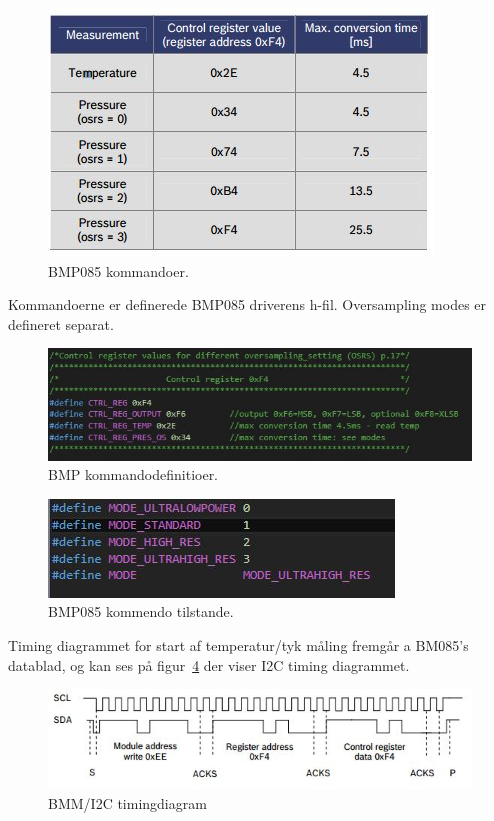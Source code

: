 \begin{figure}[h]
	\centering
	\includegraphics[width=0.6\linewidth]{figs/bmp085_commands}
	\caption{BMP085 kommandoer.}
	\label{fig:bmp085commands}
\end{figure}

Kommandoerne er definerede BMP085 driverens h-fil. Oversampling modes er defineret separat.

\begin{figure}[h]
	\centering
	\includegraphics[width=0.7\linewidth]{figs/bmp085_command_defines}
	\caption{BMP kommandodefinitioer.}
	\label{fig:bmp085commanddefines}
\end{figure}

\begin{figure}[h]
	\centering
	\includegraphics[width=0.7\linewidth]{figs/bmp085_command_modes}
	\caption{BMP085 kommendo tilstande.}
	\label{fig:bmp085commandmodes}
\end{figure}

Timing diagrammet for start af temperatur/tyk måling fremgår a BM085’s datablad, og kan ses på figur~\ref{fig:bmpi2ctiming} der viser I2C timing diagrammet.

\begin{figure}[H]
	\centering
	\includegraphics[width=0.9\linewidth]{figs/bmp_i2c_timing}
	\caption{BMM/I2C timingdiagram}
	\label{fig:bmpi2ctiming}
\end{figure}

